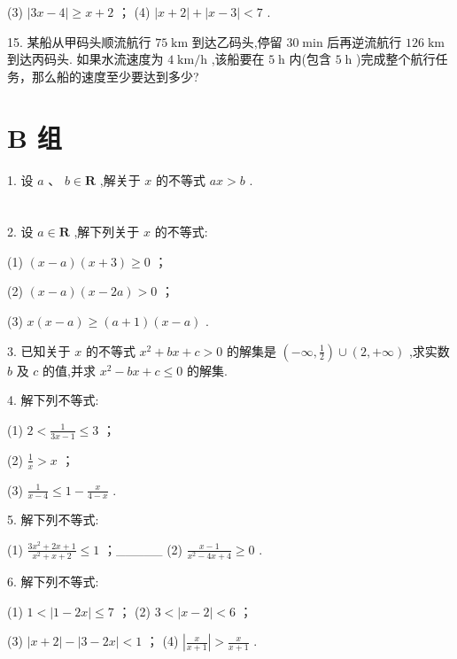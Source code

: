 \documentclass[10pt]{article}
\begin{document}
(3) \(\left| {{3x} - 4}\right|  \geq  x + 2\) ； (4) \(\left| {x + 2}\right|  + \left| {x - 3}\right|  < 7\) .

15. 某船从甲码头顺流航行 \({75}\mathrm{\;{km}}\) 到达乙码头,停留 \({30}\mathrm{\;{min}}\) 后再逆流航行 \({126}\mathrm{\;{km}}\) 到达丙码头. 如果水流速度为 \(4\mathrm{\;{km}}/\mathrm{h}\) ,该船要在 \(5\mathrm{\;h}\) 内(包含 \(5\mathrm{\;h}\) )完成整个航行任务，那么船的速度至少要达到多少?

\section*{B 组}

1. 设 \(a\text{ 、 }b \in  \mathbf{R}\) ,解关于 \(x\) 的不等式 \({ax} > b\) .



\section*{}

2. 设 \(a \in  \mathbf{R}\) ,解下列关于 \(x\) 的不等式:

(1) \(\left( {x - a}\right) \left( {x + 3}\right)  \geq  0\) ；

(2) \(\left( {x - a}\right) \left( {x - {2a}}\right)  > 0\) ；

(3) \(x\left( {x - a}\right)  \geq  \left( {a + 1}\right) \left( {x - a}\right)\) .

3. 已知关于 \(x\) 的不等式 \({x}^{2} + {bx} + c > 0\) 的解集是 \(\left( {-\infty ,\frac{1}{2}}\right)  \cup  \left( {2, + \infty }\right)\) ,求实数 \(b\) 及 \(c\) 的值,并求 \({x}^{2} - {bx} + c \leq  0\) 的解集.

4. 解下列不等式:

(1) \(2 < \frac{1}{{3x} - 1} \leq  3\) ；

(2) \(\frac{1}{x} > x\) ；

(3) \(\frac{1}{x - 4} \leq  1 - \frac{x}{4 - x}\) .

5. 解下列不等式:

(1) \(\frac{3{x}^{2} + {2x} + 1}{{x}^{2} + x + 2} \leq  1\) ；\_\_\_\_\_ (2) \(\frac{x - 1}{{x}^{2} - {4x} + 4} \geq  0\) .

6. 解下列不等式:

(1) \(1 < \left| {1 - {2x}}\right|  \leq  7\) ； (2) \(3 < \left| {x - 2}\right|  < 6\) ；

(3) \(\left| {x + 2}\right|  - \left| {3 - {2x}}\right|  < 1\) ； (4) \(\left| \frac{x}{x + 1}\right|  > \frac{x}{x + 1}\) .
\end{document}
